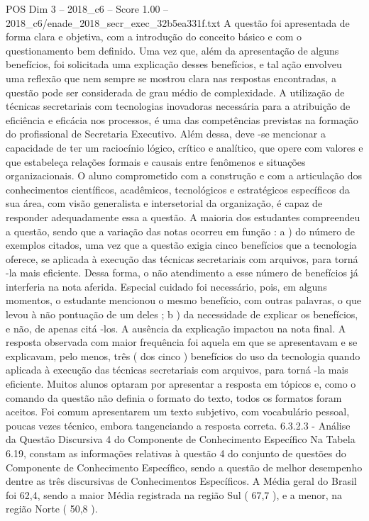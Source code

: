 \begin{textsample}{POS Dim 3 – 2018\_c6 – Score 1.00 – 2018\_c6/enade\_2018\_secr\_exec\_32b5ea331f.txt}
A questão foi apresentada de forma clara e objetiva, com a introdução do conceito básico e com o questionamento bem definido.
Uma vez que, além da apresentação de alguns benefícios, foi solicitada uma explicação desses benefícios, e tal ação envolveu uma reflexão que nem sempre se mostrou clara nas respostas encontradas, a questão pode ser considerada de grau médio de complexidade.
A utilização de técnicas secretariais com tecnologias inovadoras necessária para a atribuição de eficiência e eficácia nos processos, é uma das competências previstas na formação do profissional de Secretaria Executivo.
Além dessa, deve -se mencionar a capacidade de ter um raciocínio lógico, crítico e analítico, que opere com valores e que estabeleça relações formais e causais entre fenômenos e situações organizacionais.
O aluno comprometido com a construção e com a articulação dos conhecimentos científicos, acadêmicos, tecnológicos e estratégicos específicos da sua área, com visão generalista e intersetorial da organização, é capaz de responder adequadamente essa a questão.
A maioria dos estudantes compreendeu a questão, sendo que a variação das notas ocorreu em função : a ) do número de exemplos citados, uma vez que a questão exigia cinco benefícios que a tecnologia oferece, se aplicada à execução das técnicas secretariais com arquivos, para torná -la mais eficiente.
Dessa forma, o não atendimento a esse número de benefícios já interferia na nota aferida.
Especial cuidado foi necessário, pois, em alguns momentos, o estudante mencionou o mesmo benefício, com outras palavras, o que levou à não pontuação de um deles ; b ) da necessidade de explicar os benefícios, e não, de apenas citá -los.
A ausência da explicação impactou na nota final.
A resposta observada com maior frequência foi aquela em que se apresentavam e se explicavam, pelo menos, três ( dos cinco ) benefícios do uso da tecnologia quando aplicada à execução das técnicas secretariais com arquivos, para torná -la mais eficiente.
Muitos alunos optaram por apresentar a resposta em tópicos e, como o comando da questão não definia o formato do texto, todos os formatos foram aceitos.
Foi comum apresentarem um texto subjetivo, com vocabulário pessoal, poucas vezes técnico, embora tangenciando a resposta correta. 6.3.2.3 - Análise da Questão Discursiva 4 do Componente de Conhecimento Específico Na Tabela 6.19, constam as informações relativas à questão 4 do conjunto de questões do Componente de Conhecimento Específico, sendo a questão de melhor desempenho dentre as três discursivas de Conhecimentos Específicos.
A Média geral do Brasil foi 62,4, sendo a maior Média registrada na região Sul ( 67,7 ), e a menor, na região Norte ( 50,8 ).

\end{textsample}
